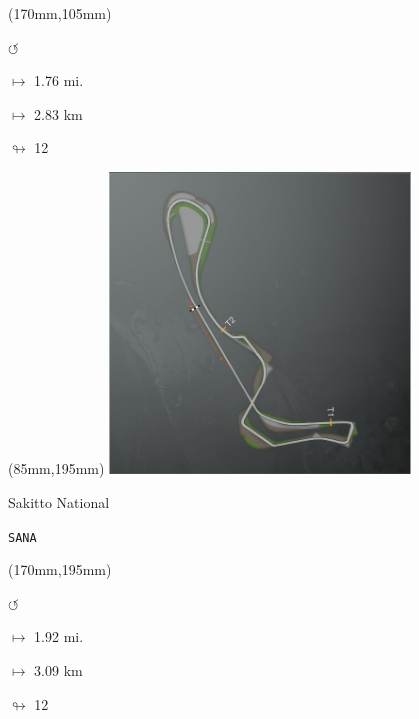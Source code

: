 \begin{textblock*}{30mm}(170mm,105mm)%
\par \Huge$\circlearrowleft$
\Large
\par$\mapsto$ 1.76 mi.
\par$\mapsto$ 2.83 km
\par$\looparrowright$ 12
\end{textblock*}
\begin{textblock*}{80mm}(85mm,195mm)%
\includegraphics[width=80mm]{TR/2015-05-20_00054.png}
\centerline{Sakitto National}
\par\hfill\tiny\tt SANA\\
\end{textblock*}
\begin{textblock*}{30mm}(170mm,195mm)%
\par \Huge$\circlearrowleft$
\Large
\par$\mapsto$ 1.92 mi.
\par$\mapsto$ 3.09 km
\par$\looparrowright$ 12
\end{textblock*}
\null\newpage

